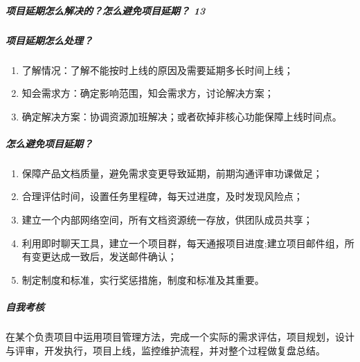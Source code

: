 \documentclass[letterpaper,11pt,english]{sphinxmanual}
\begin{document}
\subparagraph{项目延期怎么解决的？怎么避免项目延期？ 13\sphinxfootnotemark[567]}
\label{\detokenize{chapter_knowledge/project_manage:id13}}%
\begin{footnotetext}[567]\sphinxAtStartFootnote
{}
%
\end{footnotetext}\ignorespaces 

\subparagraph{项目延期怎么处理？}
\label{\detokenize{chapter_knowledge/project_manage:id14}}\begin{enumerate}
%
\item {} 
了解情况：了解不能按时上线的原因及需要延期多长时间上线；

\item {} 
知会需求方：确定影响范围，知会需求方，讨论解决方案；

\item {} 
确定解决方案：协调资源加班解决；或者砍掉非核心功能保障上线时间点。

\end{enumerate}


\subparagraph{怎么避免项目延期？}
\label{\detokenize{chapter_knowledge/project_manage:id15}}\begin{enumerate}
%
\item {} 
保障产品文档质量，避免需求变更导致延期，前期沟通评审功课做足；

\item {} 
合理评估时间，设置任务里程碑，每天过进度，及时发现风险点；

\item {} 
建立一个内部网络空间，所有文档资源统一存放，供团队成员共享；

\item {} 
利用即时聊天工具，建立一个项目群，每天通报项目进度;建立项目邮件组，所有变更达成一致后，发送邮件确认；

\item {} 
制定制度和标准，实行奖惩措施，制度和标准及其重要。

\end{enumerate}


\subparagraph{自我考核}
\label{\detokenize{chapter_knowledge/project_manage:id16}}
在某个负责项目中运用项目管理方法，完成一个实际的需求评估，项目规划，设计与评审，开发执行，项目上线，监控维护流程，并对整个过程做复盘总结。
\end{document}
